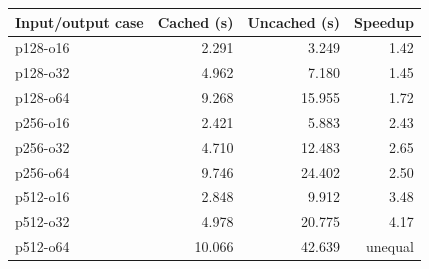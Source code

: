 \begin{tabular}{lrrr}
\toprule
Input/output case & Cached (s) & Uncached (s) & Speedup \\
\midrule
p128-o16 & 2.291 & 3.249 & 1.42 \\
p128-o32 & 4.962 & 7.180 & 1.45 \\
p128-o64 & 9.268 & 15.955 & 1.72 \\
p256-o16 & 2.421 & 5.883 & 2.43 \\
p256-o32 & 4.710 & 12.483 & 2.65 \\
p256-o64 & 9.746 & 24.402 & 2.50 \\
p512-o16 & 2.848 & 9.912 & 3.48 \\
p512-o32 & 4.978 & 20.775 & 4.17 \\
p512-o64 & 10.066 & 42.639 & unequal \\
\bottomrule
\end{tabular}
